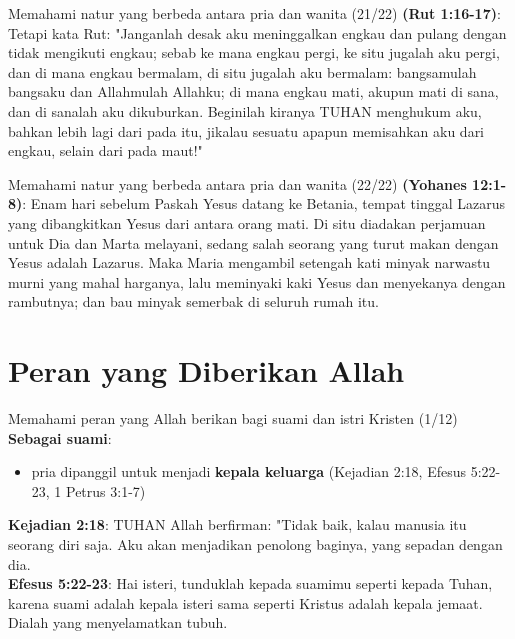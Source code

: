 \documentclass{beamer}
\theoremstyle{mystyle}
\let\emph\relax %
\begin{document}
\begin{frame}{Memahami natur yang berbeda antara pria dan wanita (21/22)}
	\emph{Rut} \textbf{(Rut 1:16-17)}: Tetapi kata Rut: "Janganlah desak aku meninggalkan engkau dan pulang dengan tidak mengikuti engkau; sebab ke mana engkau pergi, ke situ jugalah aku pergi, dan di mana engkau bermalam, di situ jugalah aku bermalam: bangsamulah bangsaku dan Allahmulah Allahku; di mana engkau mati, akupun mati di sana, dan di sanalah aku dikuburkan. Beginilah kiranya TUHAN menghukum aku, bahkan lebih lagi dari pada itu, jikalau sesuatu apapun memisahkan aku dari engkau, selain dari pada maut!"
\end{frame}

\begin{frame}{Memahami natur yang berbeda antara pria dan wanita (22/22)}
	\emph{Maria saudara Lazarus} \textbf{(Yohanes 12:1-8)}: Enam hari sebelum Paskah Yesus datang ke Betania, tempat tinggal Lazarus yang dibangkitkan Yesus dari antara orang mati. Di situ diadakan perjamuan untuk Dia dan Marta melayani, sedang salah seorang yang turut makan dengan Yesus adalah Lazarus. Maka Maria mengambil setengah kati minyak narwastu murni yang mahal harganya, lalu meminyaki kaki Yesus dan menyekanya dengan rambutnya; dan bau minyak semerbak di seluruh rumah itu.	
\end{frame}

\section{Peran yang Diberikan Allah}
\begin{frame}{Memahami peran yang Allah berikan bagi suami dan istri Kristen (1/12)}
	\textbf{Sebagai suami}:
	\begin{itemize}
		\item pria dipanggil untuk menjadi \textbf{kepala keluarga} (Kejadian 2:18, Efesus 5:22-23, 1 Petrus 3:1-7)
	\end{itemize}
	\bigskip
	\textbf{Kejadian 2:18}: TUHAN Allah berfirman: "Tidak baik, kalau manusia itu seorang diri saja. Aku akan menjadikan penolong baginya, yang sepadan dengan dia. \\
	\textbf{Efesus 5:22-23}: Hai isteri, tunduklah kepada suamimu seperti kepada Tuhan, karena suami adalah kepala isteri sama seperti Kristus adalah kepala jemaat. Dialah yang menyelamatkan tubuh.
\end{frame}
\end{document}
